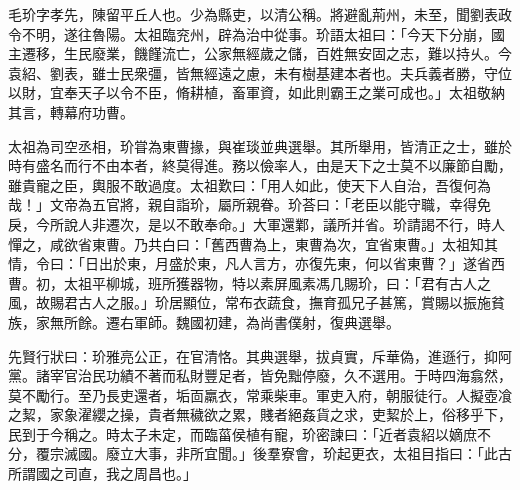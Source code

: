 
\begin{pinyinscope}
毛玠字孝先，陳留平丘人也。少為縣吏，以清公稱。將避亂荊州，未至，聞劉表政令不明，遂往魯陽。太祖臨兖州，辟為治中從事。玠語太祖曰：「今天下分崩，國主遷移，生民廢業，饑饉流亡，公家無經歲之儲，百姓無安固之志，難以持乆。今袁紹、劉表，雖士民衆彊，皆無經遠之慮，未有樹基建本者也。夫兵義者勝，守位以財，宜奉天子以令不臣，脩耕植，畜軍資，如此則霸王之業可成也。」太祖敬納其言，轉幕府功曹。

太祖為司空丞相，玠甞為東曹掾，與崔琰並典選舉。其所舉用，皆清正之士，雖於時有盛名而行不由本者，終莫得進。務以儉率人，由是天下之士莫不以廉節自勵，雖貴寵之臣，輿服不敢過度。太祖歎曰：「用人如此，使天下人自治，吾復何為哉！」文帝為五官將，親自詣玠，屬所親眷。玠荅曰：「老臣以能守職，幸得免戾，今所說人非遷次，是以不敢奉命。」大軍還鄴，議所并省。玠請謁不行，時人憚之，咸欲省東曹。乃共白曰：「舊西曹為上，東曹為次，宜省東曹。」太祖知其情，令曰：「日出於東，月盛於東，凡人言方，亦復先東，何以省東曹？」遂省西曹。初，太祖平柳城，班所獲器物，特以素屏風素馮几賜玠，曰：「君有古人之風，故賜君古人之服。」玠居顯位，常布衣蔬食，撫育孤兄子甚篤，賞賜以振施貧族，家無所餘。遷右軍師。魏國初建，為尚書僕射，復典選舉。

先賢行狀曰：玠雅亮公正，在官清恪。其典選舉，拔貞實，斥華偽，進遜行，抑阿黨。諸宰官治民功績不著而私財豐足者，皆免黜停廢，久不選用。于時四海翕然，莫不勵行。至乃長吏還者，垢靣羸衣，常乘柴車。軍吏入府，朝服徒行。人擬壺飡之絜，家象濯纓之操，貴者無穢欲之累，賤者絕姦貨之求，吏絜於上，俗移乎下，民到于今稱之。時太子未定，而臨菑侯植有寵，玠密諫曰：「近者袁紹以嫡庶不分，覆宗滅國。廢立大事，非所宜聞。」後羣寮會，玠起更衣，太祖目指曰：「此古所謂國之司直，我之周昌也。」


\end{pinyinscope}
